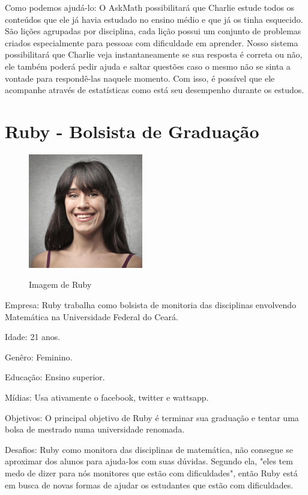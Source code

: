 Como podemos ajudá-lo: O AskMath possibilitará que Charlie estude 
todos os conteúdos que ele j\'a havia estudado no ensino médio e que já os tinha esquecido. São lições agrupadas por disciplina, cada lição possui um conjunto de problemas criados especialmente para 
pessoas com dificuldade em aprender. Nosso sistema possibilitará que Charlie veja instantaneamente se sua resposta é correta ou não, ele também poderá pedir ajuda 
e saltar quest\~oes caso o mesmo não se sinta a vontade para respondê-las naquele 
momento. Com isso, é possível que ele acompanhe através de estatísticas como 
está seu desempenho durante os estudos.

\section{Ruby - Bolsista de Graduação}

\begin{figure}[H]
\centering
\caption{Imagem de Ruby}
\includegraphics[width=5cm]{figuras/personas/figura_persona_2}
\label{figura_persona_2}
\end{figure}


Empresa: Ruby trabalha como bolsista de monitoria das disciplinas envolvendo 
Matemática na Universidade Federal do Ceará.

Idade: 21 anos.

Genêro: Feminino.

Educação: Ensino superior.

Mídias: Usa ativamente o facebook, twitter e wattsapp.

Objetivos: O principal objetivo de Ruby é terminar sua graduação e tentar uma 
bolsa de mestrado numa universidade renomada.

Desafios: Ruby como monitora das disciplinas de matemática, não consegue se
aproximar dos alunos para ajuda-los com suas dúvidas. Segundo ela, "eles tem medo de 
dizer para nós monitores que est\~ao com dificuldades", então Ruby está em busca de 
novas formas de ajudar os estudantes que estão com dificuldades.

